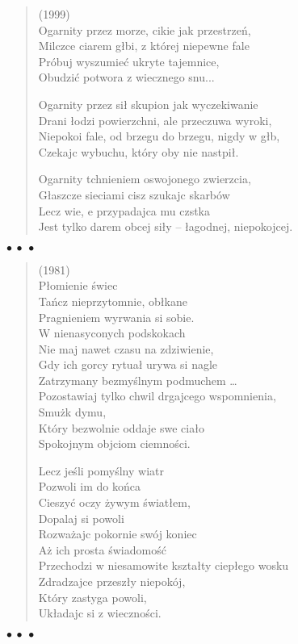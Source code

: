 \documentclass{article} %
\newenvironment{wierszd}[2]
	{\begin{verse} \hspace*{-1em}{\bf #1}\hfill{\small{(#2)}}\\[.5ex] }
	{\end{verse} \begin{center}$\bullet\ \bullet\ \bullet$\end{center}}
\newcommand{\e}{\eob}
\renewcommand{\a}{\aob}
\renewcommand{\o}{\'{o}}
\newcommand{\n}{\'{n}}
\newcommand{\s}{\'{s}}
\newcommand{\ci}{\'{c}}
\newcommand{\rz}{\zkb}
\begin{document}
\begin{wierszd}{}{1999}
Ogarni{\e}ty przez morze, ci{\e}{\rz}kie jak przestrze{\n},\\
Milcz{\a}ce ci{\e}{\rz}arem g{\l}{\e}bi, z kt{\o}rej niepewne fale\\
Pr{\o}buj{\a} wyszumie{\ci} ukryte tajemnice,\\
Obudzi{\ci} potwora z wiecznego snu...

Ogarni{\e}ty przez si{\l}{\e} skupion{\a} jak wyczekiwanie\\
Dra{\rz}ni {\l}odzi{\a} powierzchni{\e}, ale przeczuwa wyroki,\\
Niepokoi fale, od brzegu do brzegu, nigdy w g{\l}{\a}b,\\
Czekaj{\a}c wybuchu, kt{\o}ry oby nie nast{\a}pi{\l}.

Ogarni{\e}ty tchnieniem oswojonego zwierz{\e}cia,\\
G{\l}aszcze sieciami cisz{\e} szukaj{\a}c skarb{\o}w\\
Lecz wie, {\rz}e przypadaj{\a}ca mu cz{\a}stka\\
Jest tylko darem obcej si{\l}y -- {\l}agodnej, niepokoj{\a}cej.
\end{wierszd}

\begin{wierszd} {Dwie {\s}wiece}{1981}
P{\l}omienie {\s}wiec \\ 
Ta{\n}cz{\a} nieprzytomnie, ob{\l}{\a}kane \\ 
Pragnieniem wyrwania si{\e} sobie. \\ 
W nienasyconych podskokach \\ 
Nie maj{\a} nawet czasu na zdziwienie, \\ 
Gdy ich gor{\a}cy rytua{\l} urywa si{\e} nagle \\ 
Zatrzymany bezmy{\s}lnym podmuchem \ldots \\ 
Pozostawiaj{\a} tylko chwil{\e} drgaj{\a}cego wspomnienia, \\ 
Smu\.{z}k{\e} dymu, \\ 
Kt{\o}ry bezwolnie oddaje swe cia{\l}o \\ 
Spokojnym obj{\e}ciom ciemno{\s}ci. 

Lecz je{\s}li pomy{\s}lny wiatr \\ 
Pozwoli im do ko{\n}ca \\ 
Cieszy{\ci} oczy \.{z}ywym {\s}wiat{\l}em, \\ 
Dopalaj{\a} si{\e} powoli \\ 
Rozwa\.{z}aj{\a}c pokornie sw{\o}j koniec \\ 
A\.{z} ich prosta {\s}wiadomo{\s}{\ci} \\ 
Przechodzi w niesamowite kszta{\l}ty ciep{\l}ego wosku \\ 
Zdradzaj{\a}ce przesz{\l}y niepok{\o}j, \\ 
Kt{\o}ry zastyga powoli, \\ 
Uk{\l}adaj{\a}c si{\e} z wieczno{\s}ci{\a}.

\end{wierszd}
\end{document}
